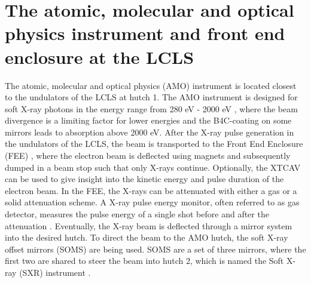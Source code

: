 \section[The AMO instrument and FEE at the LCLS]{The atomic, molecular and optical physics instrument and front end enclosure at the LCLS}\label{sec:amo-instrument}
The atomic, molecular and optical physics (AMO) instrument is located closest to the undulators of the LCLS at hutch 1. The AMO instrument is designed for soft X-ray photons in the energy range from 280 eV - 2000 eV \citep{Ferguson-2015-JSR,Bozek-2009-EPJST}, where the beam divergence is a limiting factor for lower energies and the B4C-coating on some mirrors leads to absorption above 2000 eV. After the X-ray pulse generation in the undulators of the LCLS, the beam is transported to the Front End Enclosure (FEE) \citep{Moeller-2011-NIMPR}, where the electron beam is deflected using magnets and subsequently dumped in a beam stop such that only X-rays continue. Optionally, the XTCAV \citep{Behrens-2014-NatCom} can be used to give insight into the kinetic energy and pulse duration of the electron beam. In the FEE, the X-rays can be attenuated with either a gas or a solid attenuation scheme. A X-ray pulse energy monitor, often referred to as gas detector, measures the pulse energy of a single shot before and after the attenuation \citep{Hau-Riege-2010-PRL-2}. Eventually, the X-ray beam is deflected through a mirror system into the desired hutch. To direct the beam to the AMO hutch, the soft X-ray offset mirrors (SOMS) are being used. SOMS are a set of three mirrors, where the first two are shared to steer the beam into hutch 2, which is named the Soft X-ray (SXR) instrument \citep{Schlotter-2012-RSI,Soufli-2012-AppOpt,Dakovski-2015-JSR}.
